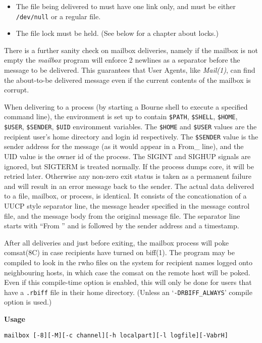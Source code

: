 \begin{itemize}
\item The file being delivered to must have one link only, and must be either 
{\tt /dev/null} or a regular file.
\item The file lock must be held. (See below for a chapter about locks.)  
\end{itemize}


There is a further sanity check on mailbox deliveries, namely if
the mailbox is not empty the {\em mailbox} program will
enforce 2 newlines as a separator before the message to be 
delivered. This guarantees that User Agents, like {\em Mail(1)},
can find the about-to-be delivered message even  if the current
contents of the mailbox is corrupt.

When delivering to a process (by starting a Bourne shell to 
execute a specified command line), the environment is set up to 
contain {\tt \$PATH}, {\tt \$SHELL}, {\tt \$HOME}, 
{\tt \$USER},
{\tt \$SENDER},  {\tt \$UID} environment variables. The 
{\tt \$HOME} and {\tt \$USER} values are the recipient user's home
directory and login id respectively. The {\tt \$SENDER} value is
the sender address for the message (as it would appear in a From\_
line), and the UID value is the owner id of the process. The
SIGINT and SIGHUP signals are ignored, but SIGTERM is treated
normally. If the process dumps core, it will be retried later.
Otherwise any non-zero exit status is taken as a permanent 
failure and will result in an error message back to the sender.
The actual data delivered to a file, mailbox,  or process, is
identical. It  consists of the concationation of a UUCP style
separator line, the message header specified in the message 
control file, and the message body from the original message file.
The separator line starts with ``From '' and is followed by the
sender address and a timestamp.

After all deliveries and just before exiting, the mailbox process
will poke comsat(8C) in case recipients have turned on biff(1).
The program may be compiled to look in the rwho files on the 
system for recipient names logged onto neighbouring hosts, in which
case the comsat on the remote host will be poked. Even if this
compile-time option is enabled, this will only be done for users
that have a {\tt .rbiff} file in their home directory. (Unless an
`{\tt -DRBIFF\_ALWAYS}' compile option is used.)

{\bf Usage}

\begin{verbatim}
mailbox [-8][-M][-c channel][-h localpart][-l logfile][-VabrH] 
\end{verbatim}



